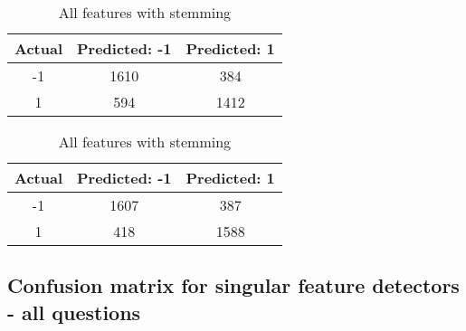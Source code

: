 \begin{table}[!htb]
	\caption{Confusion Matrix for the SGD classifier, with loss='log'.}
	\begin{minipage}{.5\linewidth}
		\caption{Unprocessed}
		\centering
		\begin{tabular}{| c | c | c |}
			\hline
			Actual 		& Predicted: -1	& Predicted: 1	\\ \hline
			-1			& 1610			& 384			\\ \hline
			1			& 594			& 1412			\\ \hline
		\end{tabular}
	\end{minipage}%
	\begin{minipage}{.5\linewidth}
		\caption{All features with stemming}
		\centering
		\begin{tabular}{| c | c | c |}
			\hline
			Actual 		& Predicted: -1	& Predicted: 1	\\ \hline
			-1			& 1607			& 387			\\ \hline
			1			& 418			& 1588			\\ \hline
		\end{tabular}
	\end{minipage} 
\end{table}	

\clearpage
\subsection{Confusion matrix for singular feature detectors - all questions}

